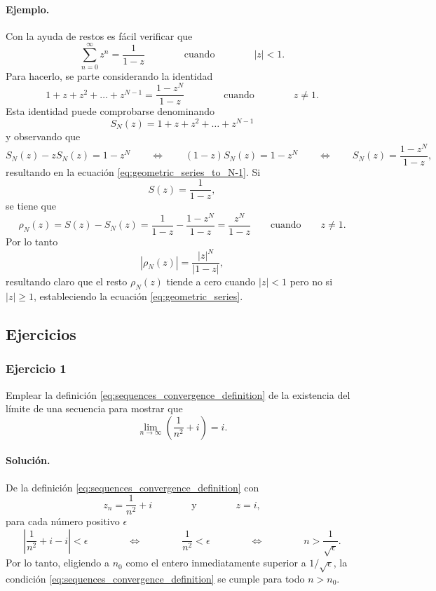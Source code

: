 \documentclass[a4paper]{report}
\begin{document}
\paragraph{Ejemplo.} Con la ayuda de restos es fácil verificar que
\begin{equation}\label{eq:geometric_series}
 \sum_{n=0}^\infty z^n=\frac{1}{1-z}
 \qquad\qquad\textrm{cuando}\qquad\qquad
 |z|<1.
\end{equation}
Para hacerlo, se parte considerando la identidad
\begin{equation}\label{eq:geometric_series_to_N-1}
 1+z+z^2+\dots+z^{N-1}=\frac{1-z^N}{1-z}
 \qquad\qquad\textrm{cuando}\qquad\qquad
 z\neq 1. 
\end{equation}
Esta identidad puede comprobarse denominando 
\[
 S_N(z)=1+z+z^2+\dots+z^{N-1}
\]
y observando que 
\[
 S_N(z)-zS_N(z)=1-z^N
 \qquad\Leftrightarrow\qquad
 (1-z)S_N(z)=1-z^N
 \qquad\Leftrightarrow\qquad
 S_N(z)=\frac{1-z^N}{1-z},
\]
resultando en la ecuación \ref{eq:geometric_series_to_N-1}. Si
\[
 S(z)=\frac{1}{1-z},
\]
se tiene que 
\[
 \rho_N(z)=S(z)-S_N(z)=\frac{1}{1-z}-\frac{1-z^N}{1-z}=\frac{z^N}{1-z}
 \qquad\textrm{cuando}\qquad
 z\neq 1.
\]
Por lo tanto
\[
 |\rho_N(z)|=\frac{|z|^N}{|1-z|},
\]
resultando claro que el resto \(\rho_N(z)\) tiende a cero cuando \(|z|<1\) pero no si \(|z|\geq1\), estableciendo la ecuación \ref{eq:geometric_series}.

\subsection*{Ejercicios}

\subsubsection{Ejercicio 1}

Emplear la definición \ref{eq:sequences_convergence_definition} de la existencia del límite de una secuencia para mostrar que 
\[
 \lim_{n\to\infty}\left(\frac{1}{n^2}+i\right)=i.
\]

\paragraph{Solución.} De la definición \ref{eq:sequences_convergence_definition} con 
\[
 z_n=\frac{1}{n^2}+i
 \qquad\qquad\textrm{y}\qquad\qquad
 z=i,
\]
para cada número positivo \(\epsilon\)
\[
 \left|\frac{1}{n^2}+i-i\right|<\epsilon
 \qquad\qquad\Leftrightarrow\qquad\qquad 
 \frac{1}{n^2}<\epsilon
 \qquad\qquad\Leftrightarrow\qquad\qquad 
 n>\frac{1}{\sqrt{\epsilon}}.
\]
Por lo tanto, eligiendo a \(n_0\) como el entero inmediatamente superior a \(1/\sqrt{\epsilon}\), la condición \ref{eq:sequences_convergence_definition} se cumple para todo \(n>n_0\).
\end{document}
